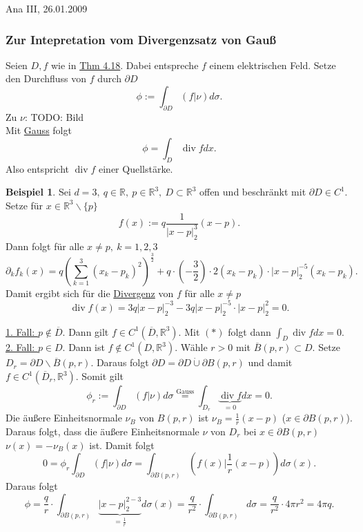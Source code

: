 \documentclass[a4paper]{report}
\newcommand{\R}{\mathbb{R}}
\newcommand{\dcup}{\dot{\cup}}
\newcommand{\jlabel}[1]{\label{j_#1}}
\newcommand{\jshortlink}[1]{\jhyperref{#1}{\text{#1}}}
\newcommand{\jhyperref}[2]{\hyperref[j_#1]{#2}}
\newcommand{\jlink}[1]{\jhyperref{#1}{#1}}
\newcommand{\jspacesmall}{\vspace{4pt}}
\newcommand{\jdate}[1]{\jspacesmall\begin{center}\jlabel{#1}\tiny{Ana III, #1}\end{center}}
\renewcommand{\div}{\mathop{\mathrm{{div}}}}
\theoremstyle{plain}
\theoremstyle{definition}
\newtheorem{expl}[thm]{Beispiel}
\begin{document}
{{{{\jdate{26.01.2009}

\subsubsection{Zur Intepretation vom Divergenzsatz von Gauß}
Seien $D,f$ wie in \jlink{Thm 4.18}. Dabei entspreche $f$ einem elektrischen Feld. Setze den Durchfluss von $f$ durch $\partial D$
\[
    \phi := \int_{\partial D} (f|\nu) d\sigma.
\]
Zu $\nu$: TODO: Bild\\
Mit \jlink{Gauss} folgt
\[
    \tag{$*$}
    \phi = \int_D \div f dx.
\]
Also entspricht $\div f$ einer Quellstärke.

\begin{expl}
    \jlabel{Bsp 4.20}
    Sei $d=3,\ q\in \R,\ p \in \R^3,\ D\subset \R^3$ offen und beschränkt mit $\partial D\in C^1$. Setze für $x\in\R^3\backslash \{p\}$
    \[
        f(x) := q\frac{1}{|x-p|_2^3}(x-p).
    \]
    Dann folgt für alle $x \ne p, \ k=1,2,3$
    \[
        \partial_k f_k(x) = q\left(\sum_{k=1}^3 (x_k - p_k)^2 \right)^\frac{3}{2} + q\cdot \left(-\frac{3}{2} \right)\cdot 2(x_k-p_k)\cdot |x-p|_2^{-5}(x_k-p_k).
    \]
    Damit ergibt sich für die \jlink{Divergenz} von $f$ für alle $x\ne p$
    \[
        \div f(x) = 3q|x-p|_2^{-3} - 3q|x-p|_2^{-5}\cdot |x-p|_2^{2} = 0.
    \]

    \uline{1. Fall: $p\notin \overline{D}$}. Dann gilt $f\in C^1(\overline{D}, \R^3)$. Mit $(*)$ folgt dann $\int_D\div f dx = 0$.\\
    \uline{2. Fall: $p \in D$}. Dann ist $f\notin C^1(D,\R^3)$. Wähle $r>0$ mit $\overline{B}(p,r)\subset D$. Setze $D_r = \partial D\backslash \overline{B}(p,r)$. Daraus folgt $\partial D = \partial D \dcup \partial B(p,r)$ und damit $f\in C^1(\overline{D}_r, \R^3)$. Somit gilt
    \[
        \phi_r := \int_{\partial D} (f|\nu)d\sigma \overset{\jshortlink{Gauss}}{=} \int_{D_r} \underbrace{\div f}_{=0}dx = 0.
    \]
    Die äußere Einheitsnormale $\nu_B$ von $B(p,r)$ ist $\nu_B = \frac{1}{r}(x-p)$ ($x\in \partial B(p,r)$).
    Daraus folgt, dass die äußere Einheitsnormale $\nu$ von $D_r$ bei $x \in \partial B(p,r)$ $\nu(x) = -\nu_B(x)$ ist. Damit folgt
    \[
        0 = \phi_r \int_{\partial D} (f|\nu)d\sigma = \int_{\partial B(p,r)} \left(f(x)|\frac{1}{r} (x-p) \right)d\sigma(x).
    \]
    Daraus folgt
    \[
        \phi = \frac{q}{r} \cdot \int_{\partial B(p,r)} \underbrace{|x-p|_2^{2-3}}_{= \frac{1}{r}} d\sigma(x) = \frac{q}{r^2} \cdot \int_{\partial B(p,r)} d\sigma = \frac{q}{r^2} \cdot 4\pi r^2 = 4\pi q.
    \]
\end{expl}


}}}}
\end{document}
